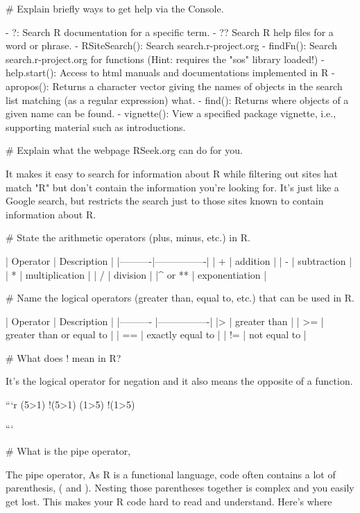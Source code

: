 {{# Explain briefly ways to get help via the Console.

- ?: Search R documentation for a specific term.
- ?? Search R help files for a word or phrase.
- RSiteSearch(): Search search.r-project.org
- findFn(): Search search.r-project.org for functions (Hint: requires the "sos" library loaded!)
- help.start(): Access to html manuals and documentations implemented in R 
- apropos(): Returns a character vector giving the names of objects in the search list matching (as a regular expression) what.
- find(): Returns where objects of a given name can be found.
- vignette(): View a specified package vignette, i.e., supporting material such as introductions. 

# Explain what the webpage RSeek.org can do for you.

It makes it easy to search for information about R while filtering out sites hat match "R" but don't contain the information you're looking for. It's just like a Google search, but restricts the search just to those sites known to contain information about R.

# State the arithmetic operators (plus, minus, etc.) in R.  

| Operator | Description    |
|----------|----------------|
| +        | addition       |
| -        | subtraction    |
| *        | multiplication |
| /        | division       |
|^ or **   | exponentiation |

# Name the logical operators (greater than, equal to, etc.) that can be used in R.

| Operator  | 	Description |
|---------- |----------------|
|>          | 	greater than |
| >=  |	greater than or equal to  |
| == | 	exactly equal to |
| != |	not equal to | 


# What does ! mean in R?

It's the logical operator for negation and it also means the opposite of a function.

```{r}
(5>1)
!(5>1)
(1>5)
!(1>5)


```


# What is the pipe operator, %

The pipe operator, %
As R is a functional language, code often contains a lot of parenthesis, ( and ). Nesting those parentheses together is complex and you easily get lost. This makes your R code hard to read and understand. Here's where %


}}
